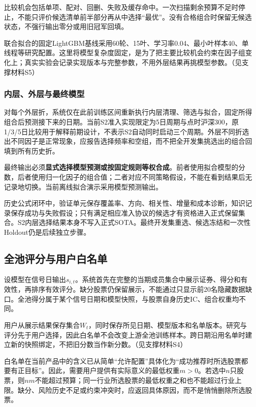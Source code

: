 \documentclass[UTF8,12pt,a4paper,fontset=none]{ctexart}
\begin{document}
比较机会包括单项、配对、回删、失败及缓存命中。一次扫描剩余预算不足时停止，不能只评价候选清单前半部分再从中选择“最优”。没有合格组合时保留无候选状态，不强行输出零分或用旧冠军回填。


联合拟合的固定LightGBM基线采用60轮、15叶、学习率0.04、最小叶样本40、单线程等研究配置。这里将模型复杂度固定，是为了把主要比较机会约束在因子组变化上；真实实验会记录实现版本与完整参数，不用外层结果再挑模型参数。\cite{r1}（见支撑材料S5）


\subsubsection{内层、外层与最终模型}

对每个外层折，系统仅在此前训练区间重新执行内层清理、筛选与拟合，固定所得组合后预测接下来的日期。当前S2准入实现限定为5日周期与点时沪深300，原1/3/5日比较用于解释前期设计，不表示S2自动同时启动三个周期。外层不同折选出不同因子是正常现象，应报告选择频率和空组，而不把全开发集挑选出的组合回填到所有历史折。


最终输出必须\textbf{显式选择模型预测或按固定规则等权合成}。前者使用拟合模型的分数，后者使用归一化因子的组合值；二者对应不同策略假设，不能在看到结果后无记录地切换。当前离线拟合演示采用模型预测输出。


历史公式闭环中，验证单元保存覆盖率、方向、相关性、增量和成本诊断，知识记录保存成功与失败假设；只有满足相应准入协议的候选才有资格进入正式保留集合。S2内层选择结果本身不写入正式SOTA。最终开发集重选、候选冻结和一次性Holdout仍是后续独立步骤。


\subsection{全池评分与用户白名单}

设模型在信号日输出$s_{i,t}$。系统首先在完整的当期成员集合中展示证券、得分和有效性，再排序有效评分。缺分股票仍保留展示，不能通过只显示前20名隐藏数据缺口。全池得分属于某个信号日期和模型快照，与股票自身历史IC、组合权重均不同。


用户从展示结果保存集合$W_t$，同时保存所见日期、模型版本和名单版本。研究与评分先于用户选择，因此白名单不会改变上游全池训练样本。跨日期沿用名单时建立新的快照绑定，不把旧分数当作新分数。（见支撑材料S4）


白名单在当前产品中的含义已从简单“允许配置”具体化为“成功推荐时所选股票都要有正目标”。因此，需要用户提供有实际意义的最低权重$m>0$。若选中$n$只股票，则$n m$不能超过预算；同一行业所选股票的最低权重之和也不能超过行业上限。缺分、风险历史不足或约束冲突时，应返回具体原因，而不是悄悄删除所选股票。
\end{document}
